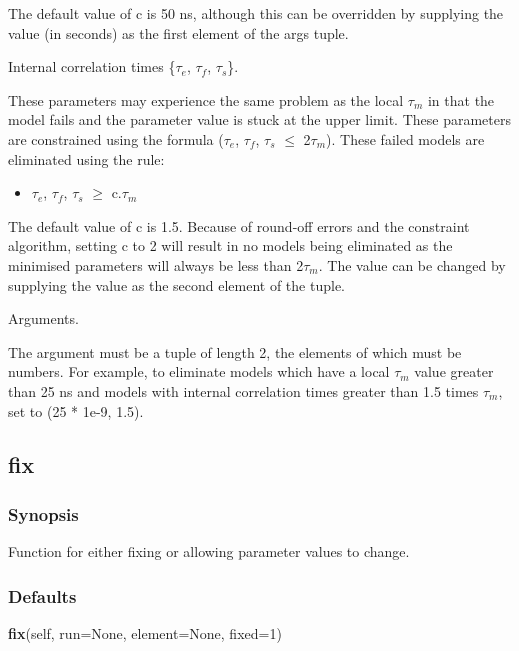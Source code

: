 The default value of c is 50 ns, although this can be overridden by supplying the value (in
seconds) as the first element of the args tuple.


Internal correlation times  \{$\tau_e$, $\tau_f$, $\tau_s$\}.

These parameters may experience the same problem as the local $\tau_m$ in that the model fails and
the parameter value is stuck at the upper limit.   These parameters are constrained using the
formula ($\tau_e$, $\tau_f$, $\tau_s$ $\le$ 2$\tau_m$).  These failed models are eliminated using the rule:

\begin{itemize}
\item[]     $\tau_e$, $\tau_f$, $\tau_s$ $\ge$ c.$\tau_m$
\end{itemize}

The default value of c is 1.5.  Because of round-off errors and the constraint  algorithm,
setting c to 2 will result in no models being eliminated as the minimised  parameters will
always be less than 2$\tau_m$.  The value can be changed by supplying the value as the second
element of the tuple.


Arguments.

The 
 argument must be a tuple of length 2, the elements of which must be numbers.  For
example, to eliminate models which have a local $\tau_m$ value greater than 25 ns and models with
internal correlation times  greater than 1.5 times $\tau_m$, set 
 to (25 * 1e-9, 1.5).


\newpage

\subsection{fix}


\subsubsection{Synopsis}

Function for either fixing or allowing parameter values to change.

\subsubsection{Defaults}

\textsf{\textbf{fix}(self, run=None, element=None, fixed=1)}


